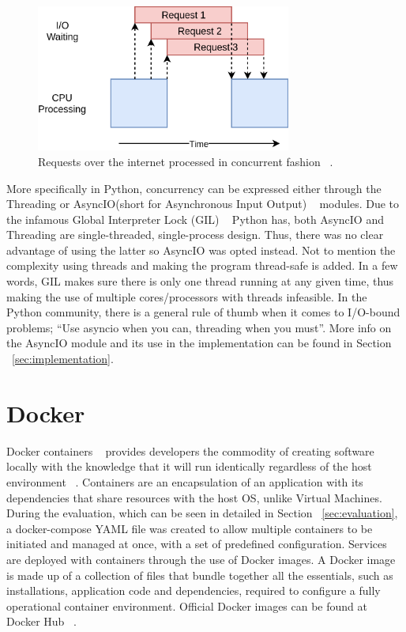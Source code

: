 \begin{figure}[ht]
 \centering
 \includegraphics[width=3.3in]{figures/concurrency_example.png}
 \caption{Requests over the internet processed in concurrent fashion ~\cite{concurrency_realpython}.}
 \label{fig:concurrency_example}
\end{figure}

More specifically in Python, concurrency can be expressed either through the Threading or AsyncIO(short for Asynchronous Input Output) ~\cite{asyncio} modules. Due to the infamous Global Interpreter Lock (GIL) ~\cite{gil_realpython} Python has, both AsyncIO and Threading are single-threaded, single-process design. Thus, there was no clear advantage of using the latter so AsyncIO was opted instead. Not to mention the complexity using threads and making the program thread-safe is added. In a few words, GIL makes sure there is only one thread running at any given time, thus making the use of multiple cores/processors with threads infeasible. 
In the Python community, there is a general rule of thumb when it comes to I/O-bound problems; “Use asyncio when you can, threading when you must”.
More info on the AsyncIO module and its use in the \pname implementation can be found in Section ~\ref{sec:implementation}.

\section{Docker}
Docker containers ~\cite{docker_containers} provides developers the commodity of creating software locally with the knowledge that it will run identically regardless of the host environment ~\cite{using_docker_book}. Containers are an encapsulation of an application with its dependencies that share resources with the host OS, unlike Virtual Machines. During the evaluation, which can be seen in detailed in Section ~\ref{sec:evaluation}, a docker-compose YAML file was created to allow multiple containers to be initiated and managed at once, with a set of predefined configuration. Services are deployed with containers through the use of Docker images. A Docker image is made up of a collection of files that bundle together all the essentials, such as installations, application code and dependencies, required to configure a fully operational container environment. Official Docker images can be found at Docker Hub ~\cite{docker_hub}.